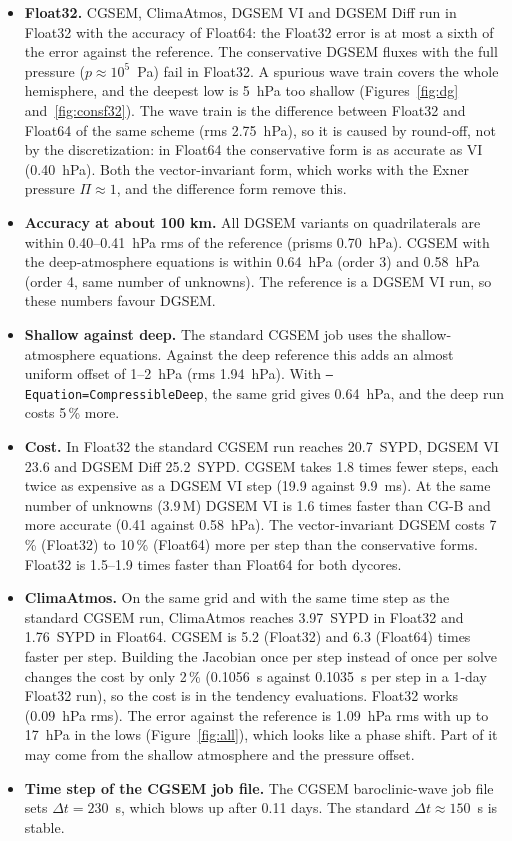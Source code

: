 \documentclass[11pt,a4paper]{article}
\newcommand{\code}[1]{\texttt{#1}}
\begin{document}
\begin{itemize}
\item \textbf{Float32.} CGSEM, ClimaAtmos, DGSEM VI and DGSEM Diff run in Float32
  with the accuracy of Float64: the Float32 error is at most a sixth of
  the error against the reference.
  The conservative DGSEM fluxes with the full pressure
  ($p\approx10^5$~Pa) fail in Float32. A spurious wave train covers the whole
  hemisphere, and the deepest low is 5~hPa too shallow
  (Figures~\ref{fig:dg} and~\ref{fig:consf32}). The wave train is the
  difference between Float32 and Float64 of the same scheme (rms
  2.75~hPa), so it is caused by round-off, not by the discretization:
  in Float64 the conservative form is as accurate as VI (0.40~hPa).
  Both the vector-invariant form, which works
  with the Exner pressure $\Pi\approx1$, and the difference form
  remove this.
\item \textbf{Accuracy at about 100 km.} All DGSEM variants on
  quadrilaterals are within 0.40--0.41~hPa rms of the reference (prisms
  0.70~hPa). CGSEM with the deep-atmosphere
  equations is within 0.64~hPa (order 3) and 0.58~hPa (order 4, same
  number of unknowns). The reference is a DGSEM VI run, so these numbers
  favour DGSEM.
\item \textbf{Shallow against deep.} The standard CGSEM job uses the
  shallow-atmosphere equations. Against the deep reference this adds an
  almost uniform offset of 1--2~hPa (rms 1.94~hPa). With
  \code{--Equation=CompressibleDeep}, the same grid gives 0.64~hPa, and
  the deep run costs 5\,\% more.
\item \textbf{Cost.} In Float32 the standard CGSEM run reaches 20.7~SYPD,
  DGSEM VI 23.6 and DGSEM Diff 25.2~SYPD. CGSEM takes 1.8 times fewer
  steps, each twice as expensive as a DGSEM VI step (19.9 against
  9.9~ms). At the same number of unknowns (3.9\,M) DGSEM VI is 1.6 times
  faster than CG-B and more accurate (0.41 against 0.58~hPa). The
  vector-invariant DGSEM costs 7\,\% (Float32) to 10\,\% (Float64) more
  per step than the conservative forms. Float32 is 1.5--1.9 times faster
  than Float64 for both dycores.
\item \textbf{ClimaAtmos.} On the same grid and with the same time step
  as the standard CGSEM run, ClimaAtmos reaches 3.97~SYPD in Float32 and
  1.76~SYPD in Float64. CGSEM is 5.2 (Float32) and 6.3 (Float64) times
  faster per step. Building the Jacobian once per step instead of once per
  solve changes the cost by only 2\,\% (0.1056~s against 0.1035~s per
  step in a 1-day Float32 run), so the cost is in the tendency
  evaluations. Float32 works (0.09~hPa rms). The error against the reference
  is 1.09~hPa rms with up to 17~hPa in the lows (Figure~\ref{fig:all}),
  which looks like a phase shift. Part of it may come from the shallow atmosphere and the
  pressure offset.
\item \textbf{Time step of the CGSEM job file.} The CGSEM baroclinic-wave job
  file sets $\Delta t=230$~s, which blows up after 0.11 days. The
  standard $\Delta t\approx150$~s is stable.
\end{itemize}
\end{document}
